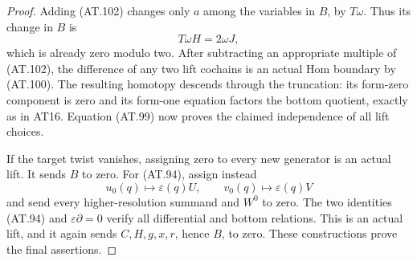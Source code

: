 \begin{proof}
Adding (AT.102) changes only $a$ among the variables in
$B$, by $T\omega$. Thus its change in $B$ is
\[
                         T\omega H=2\omega J,
 \tag{AT.103}
\]
which is already zero modulo two. After subtracting an
appropriate multiple of (AT.102), the difference of any
two lift cochains is an actual Hom boundary by (AT.100).
The resulting homotopy descends through the truncation:
its form-zero component is zero and its form-one equation
factors the bottom quotient, exactly as in AT16.
Equation (AT.99) now proves the claimed independence of
all lift choices.

If the target twist vanishes, assigning zero to every new
generator is an actual lift. It sends $B$ to zero.
For (AT.94), assign instead
\[
 u_0(q)\longmapsto\varepsilon(q)U,\qquad
 v_0(q)\longmapsto\varepsilon(q)V
 \tag{AT.104}
\]
and send every higher-resolution summand and $W^0$ to
zero. The two identities (AT.94) and
$\varepsilon\partial=0$ verify all differential and
bottom relations. This is an actual lift, and it again
sends $C,H,g,x,r$, hence $B$, to zero.
These constructions prove the final assertions.
\end{proof}
